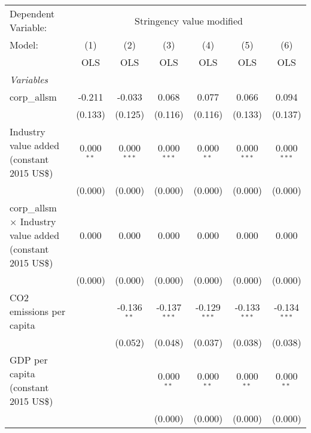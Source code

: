 
\begingroup
\centering
\begin{tabular}{lcccccc}
   \toprule
   Dependent Variable: & \multicolumn{6}{c}{Stringency value modified}\\
   Model:                                                            & (1)          & (2)           & (3)            & (4)            & (5)            & (6)\\  
                                                                     &  OLS         & OLS           & OLS            & OLS            & OLS            & OLS\\  
   \midrule
   \emph{Variables}\\
   corp\_allsm                                                       & -0.211       & -0.033        & 0.068          & 0.077          & 0.066          & 0.094\\   
                                                                     & (0.133)      & (0.125)       & (0.116)        & (0.116)        & (0.133)        & (0.137)\\   
   Industry value added (constant 2015 US\$)                         & 0.000$^{**}$ & 0.000$^{***}$ & 0.000$^{***}$  & 0.000$^{**}$   & 0.000$^{***}$  & 0.000$^{***}$\\   
                                                                     & (0.000)      & (0.000)       & (0.000)        & (0.000)        & (0.000)        & (0.000)\\   
   corp\_allsm $\times$ Industry value added (constant 2015 US\$)    & 0.000        & 0.000         & 0.000          & 0.000          & 0.000          & 0.000\\   
                                                                     & (0.000)      & (0.000)       & (0.000)        & (0.000)        & (0.000)        & (0.000)\\   
   CO2 emissions per capita                                          &              & -0.136$^{**}$ & -0.137$^{***}$ & -0.129$^{***}$ & -0.133$^{***}$ & -0.134$^{***}$\\   
                                                                     &              & (0.052)       & (0.048)        & (0.037)        & (0.038)        & (0.038)\\   
   GDP per capita (constant 2015 US\$)                               &              &               & 0.000$^{**}$   & 0.000$^{**}$   & 0.000$^{**}$   & 0.000$^{**}$\\   
                                                                     &              &               & (0.000)        & (0.000)        & (0.000)        & (0.000)\\   

\end{tabular}
